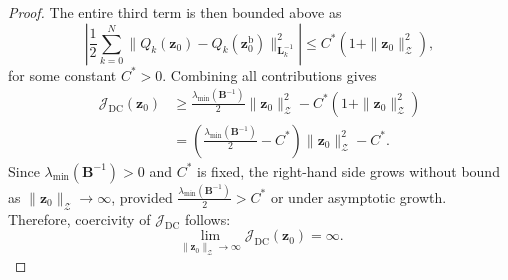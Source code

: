 \documentclass[final,1p,times]{elsarticle}
\begin{document}
\begin{proof}
The entire third term is then bounded above as
\begin{equation}
\left| \frac{1}{2} \sum_{k=0}^N \| Q_k(\mathbf{z}_0) - Q_k(\mathbf{z}_0^{\mathrm{b}}) \|_{\mathbf{L}^{-1}_k}^2 \right| \leq C^{*} (1 + \| \mathbf{z}_0 \|_{\mathcal{Z}}^2),
\end{equation}
for some constant $ C^{*} > 0 $. Combining all contributions gives
\begin{equation}
\begin{split}
\mathcal{J}_{\mathrm{DC}}(\mathbf{z}_0) 
    &\geq \frac{\lambda_{\min}\!\left(\mathbf{B}^{-1}\right)}{2} 
        \| \mathbf{z}_0 \|_{\mathcal{Z}}^2 
        - C^{*}\!\left(1 + \| \mathbf{z}_0 \|_{\mathcal{Z}}^2\right) \\
    &= \left( \frac{\lambda_{\min}\!\left(\mathbf{B}^{-1}\right)}{2} - C^{*} \right) 
        \| \mathbf{z}_0 \|_{\mathcal{Z}}^2 - C^{*}.
\end{split}
\end{equation}
Since $ \lambda_{\min}\left(\mathbf{B}^{-1}\right) > 0 $ and $ C^{*} $ is fixed, the right-hand side grows without bound as $ \| \mathbf{z}_0 \|_{\mathcal{Z}} \to \infty $, provided $ \frac{\lambda_{\min}\left(\mathbf{B}^{-1}\right)}{2} > C^{*} $ or under asymptotic growth. Therefore, coercivity of $ \mathcal{J}_{\mathrm{DC}} $ follows:
\begin{equation}
\lim_{\| \mathbf{z}_0 \|_{\mathcal{Z}} \to \infty} \mathcal{J}_{\mathrm{DC}}(\mathbf{z}_0) = \infty.
\end{equation}
\end{proof}
\end{document}

